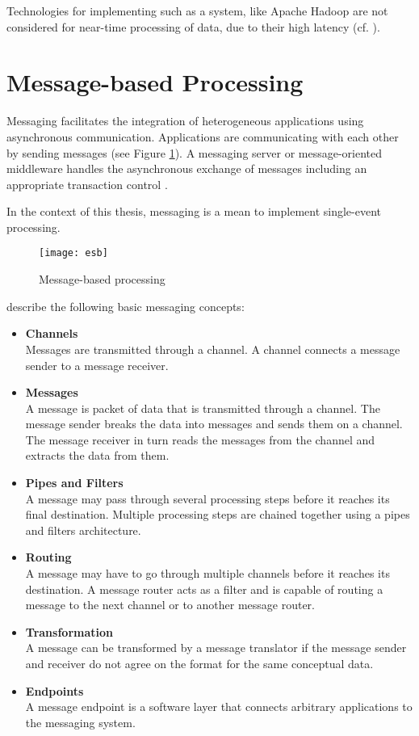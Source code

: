 Technologies for implementing such as a system, like Apache Hadoop \citep{apachehadoop} are not considered for near-time processing of data, due to their high latency (cf. \cite{Merz:2014aa}).

\section{Message-based Processing}\label{sec:message_processing}
Messaging facilitates the integration of heterogeneous applications using asynchronous communication. Applications are communicating with each other by sending messages (see Figure \ref{fig:message_based_processing}). A messaging server or message-oriented middleware handles the asynchronous exchange of messages including an appropriate transaction control \citep{conrad2006enterprise}.

In the context of this thesis, messaging is a mean to implement single-event processing.

\begin{figure}[htbp]
	\centering
	\texttt{[image: esb]}
	\caption{Message-based processing}
	\label{fig:message_based_processing}
\end{figure}

\cite{Hohpe:2003fk} describe the following basic messaging concepts:
\begin{itemize}
	\item \textbf{Channels}\\
	Messages are transmitted through a channel. A channel connects a message sender to a message receiver.
	\item \textbf{Messages}\\
	A message is packet of data that is transmitted through a channel. The message sender breaks the data into messages and sends them on a channel. The message receiver in turn reads the messages from the channel and extracts the data from them.
	\item \textbf{Pipes and Filters}\\
	A message may pass through several processing steps before it reaches its final destination. Multiple processing steps are chained together using a pipes and filters architecture.
	\item \textbf{Routing}\\
	A message may have to go through multiple channels before it reaches its destination. A message router acts as a filter and is capable of routing a message to the next channel or to another message router.
	\item \textbf{Transformation}\\
	A message can be transformed by a message translator if the message sender and receiver do not agree on the format for the same conceptual data.
	\item \textbf{Endpoints}\\
	A message endpoint is a software layer that connects arbitrary applications to the messaging system.
\end{itemize}

